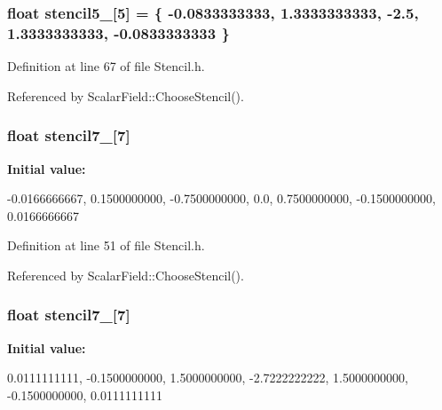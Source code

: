 \subsubsection[{stencil5\_\-2}]{\setlength{\rightskip}{0pt plus 5cm}float {\bf stencil5\_}\mbox{[}5\mbox{]} = \{ -\/0.0833333333, 1.3333333333, -\/2.5, 1.3333333333, -\/0.0833333333 \}}\label{Stencil_8h_a9bda37a23ca01214a651baeebe3eaa64}


Definition at line 67 of file Stencil.h.



Referenced by ScalarField::ChooseStencil().

\subsubsection[{stencil7\_\-1}]{\setlength{\rightskip}{0pt plus 5cm}float {\bf stencil7\_}\mbox{[}7\mbox{]}}\label{Stencil_8h_a3d5e3287f4191ae4a5673f453acc7bd1}
{\bfseries Initial value:}
\begin{DoxyCode}
 {  -0.0166666667,
                0.1500000000,
                -0.7500000000,
                0.0,
                0.7500000000,
                -0.1500000000,
                0.0166666667 }
\end{DoxyCode}


Definition at line 51 of file Stencil.h.



Referenced by ScalarField::ChooseStencil().

\subsubsection[{stencil7\_\-2}]{\setlength{\rightskip}{0pt plus 5cm}float {\bf stencil7\_}\mbox{[}7\mbox{]}}\label{Stencil_8h_acee80c560824d50b2c2101e5a582ab82}
{\bfseries Initial value:}
\begin{DoxyCode}
 { 0.0111111111,
                -0.1500000000,
                1.5000000000,
                -2.7222222222,
                1.5000000000,
                -0.1500000000,
                0.0111111111 }
\end{DoxyCode}


